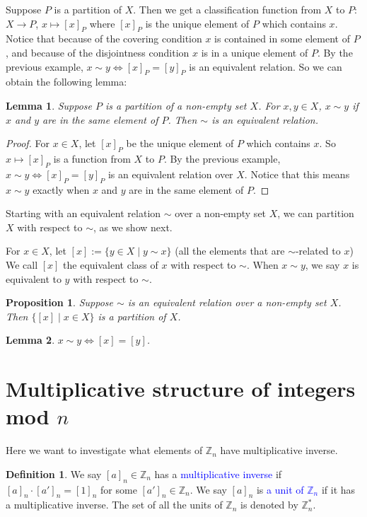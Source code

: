 \documentclass{article}
\theoremstyle{plain}
\newtheorem{lemma}{Lemma}
\newtheorem{proposition}{Proposition}
\theoremstyle{definition}
\newtheorem*{definition}{Definition}
\begin{document}
Suppose $P$ is a partition of $X$. Then we get a classification function
from $X$ to $P$: $X\to P$, $x\mapsto [x]_P$ where $[x]_P$ is the 
unique element of $P$ which contains $x$. Notice that because of
the covering condition $x$ is contained in some element of $P$,
and because of the disjointness condition $x$ is in a unique
element of $P$. By the previous example, $x\sim y\Leftrightarrow [x]_P=[y]_P$
is an equivalent relation. So we can obtain the following lemma:

\begin{lemma}
    Suppose $P$ is a partition of a non-empty set $X$.
    For $x,y\in X$, $x\sim y$ if $x$ and $y$ are in the same element
    of $P$. Then $\sim$ is an equivalent relation.
\end{lemma}

\begin{proof}
    For $x\in X$, let $[x]_P$ be the unique element of $P$
    which contains $x$. So $x\mapsto[x]_P$ is a function from $X$
    to $P$. By the previous example, $x\sim y\Leftrightarrow[x]_P=[y]_P$
    is an equivalent relation over $X$. Notice that this means 
    $x\sim y$ exactly when $x$ and $y$ are in the same element of $P$.
\end{proof}

Starting with an equivalent relation $\sim$ over a non-empty
set $X$, we can partition $X$ with respect to $\sim$,
as we show next.

For $x\in X$, let $[x]:=\{y\in X\mid y\sim x\}$ (all the elements
that are $\sim$-related to $x$) We call $[x]$ the equivalent class
of $x$ with respect to $\sim$. When $x\sim y$, we say $x$ is equivalent to
$y$ with respect to $\sim$.

\begin{proposition}
    Suppose $\sim$ is an equivalent relation over a non-empty
    set $X$. Then $\{[x]\mid x\in X\}$ is a partition of $X$.
\end{proposition}

\begin{lemma}
    $x\sim y\Leftrightarrow [x]=[y]$.
\end{lemma}

\section{Multiplicative structure of integers mod $n$}
Here we want to investigate what elements of $\mathbb{Z}_n$
have multiplicative inverse.
\begin{definition}
    We say $[a]_n\in\mathbb{Z}_n$ has a \textcolor{blue}{multiplicative inverse}
    if $[a]_n\cdot [a']_n=[1]_n$ for some $[a']_n\in\mathbb{Z}_n$. We say $[a]_n$
    is \textcolor{blue}{a unit of $\mathbb{Z}_n$} if it has a multiplicative 
    inverse. The set of all the units of $\mathbb{Z}_n$ is denoted
    by $\mathbb{Z}_n^*$.
\end{definition}
\end{document}
